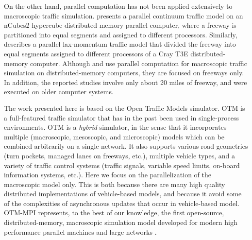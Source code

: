 On the other hand, parallel computation has not been applied extensively to macroscopic traffic simulation. \cite{chronopoulos1998real} presents a parallel continuum traffic model on an nCubes2 hypercube distributed-memory parallel computer, where a freeway is partitioned into equal segments and assigned to different processors. Similarly, \cite{johnston1999parallelization} describes a parallel lax-momentum traffic model that divided the freeway into equal segments assigned to different processors of a Cray T3E distributed-memory computer. Although  \cite{chronopoulos1998real} and \cite{johnston1999parallelization} use parallel computation for macroscopic traffic simulation on distributed-memory computers, they are focused on freeways only. In addition, the reported studies involve only about 20 miles of freeway, and were executed on older computer systems.

The work presented here is based on the Open Traffic Models simulator. OTM is a full-featured traffic simulator that has in the past been used in single-process environments. OTM \cite{gomes2020framework} is a \textit{hybrid} simulator, in the sense that it incorporates multiple (macroscopic, mesoscopic, and microscopic) models which can be combined arbitrarily on a single network. It also supports various road geometries (turn pockets, managed lanes on freeways, etc.), multiple vehicle types, and a variety of traffic control systems (traffic signals, variable speed limits, on-board information systems, etc.). Here we focus on the parallelization of the macroscopic model only. This is both because there are many high quality distributed implementations of vehicle-based models, and because it avoid some of the complexities of asynchronous updates that occur in vehicle-based model. OTM-MPI represents, to the best of our knowledge, the first open-source, distributed-memory, macroscopic simulation model developed for modern high performance parallel machines and large networks  \cite{otmmpi}.